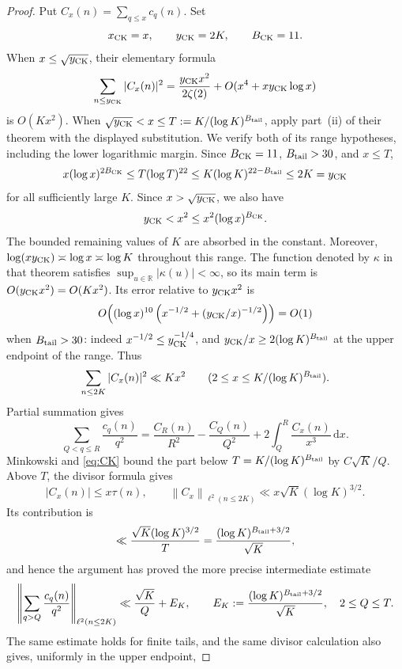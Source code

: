 \documentclass[11pt]{article}
\numberwithin{equation}{section}
\theoremstyle{definition}
\newcommand{\R}{\mathbb R}
\newcommand{\1}{\mathbf 1}
\newcommand{\dd}{\,\mathrm d}
\newcommand{\norm}[1]{\left\lVert#1\right\rVert}
\begin{document}
\begin{proof}
Put \(C_x(n)=\sum_{q\le x}c_q(n)\).
Set
\[
 x_{\rm CK}=x,\qquad y_{\rm CK}=2K,\qquad B_{\rm CK}=11.
\]
When \(x\le\sqrt {y_{\rm CK}}\), their elementary formula
\[
 \sum_{n\le y_{\rm CK}}|C_x(n)|^2
 =\frac{y_{\rm CK}x^2}{2\zeta(2)}
  +O(x^4+xy_{\rm CK}\log x)
\]
is \(O(Kx^2)\).  When
\(\sqrt {y_{\rm CK}}<x\le T:=K/(\log K)^{B_{\rm tail}}\), apply
part~(ii) of their theorem with the displayed substitution.  We verify
both of its range hypotheses, including the lower logarithmic margin.
Since \(B_{\rm CK}=11\), \(B_{\rm tail}>30\), and \(x\le T\),
\[
 x(\log x)^{2B_{\rm CK}}
 \le T(\log T)^{22}
 \le K(\log K)^{22-B_{\rm tail}}
 \le 2K=y_{\rm CK}
\]
for all sufficiently large \(K\).  Since
\(x>\sqrt {y_{\rm CK}}\), we also have
\[
 y_{\rm CK}<x^2\le x^2(\log x)^{B_{\rm CK}}.
\]
The bounded remaining values of \(K\) are absorbed in the constant.
Moreover, \(\log(xy_{\rm CK})\asymp\log x\asymp\log K\) throughout
this range.  The function denoted by \(\kappa\) in that theorem
satisfies \(\sup_{u\in\R}|\kappa(u)|<\infty\), so its main term is
\(O(y_{\rm CK}x^2)=O(Kx^2)\).  Its error relative to
\(y_{\rm CK}x^2\) is
\[
 O\!\left((\log x)^{10}
 \left(x^{-1/2}+(y_{\rm CK}/x)^{-1/2}\right)\right)=O(1)
\]
when \(B_{\rm tail}>30\): indeed
\(x^{-1/2}\le y_{\rm CK}^{-1/4}\), and
\(y_{\rm CK}/x\ge2(\log K)^{B_{\rm tail}}\) at the upper endpoint of the
range.  Thus
\begin{equation}\label{eq:CK}
 \sum_{n\le2K}|C_x(n)|^2\ll Kx^2
 \qquad
 (2\le x\le K/(\log K)^{B_{\rm tail}}).
\end{equation}
Partial summation gives
\[
 \sum_{Q<q\le R}\frac{c_q(n)}{q^2}
 =
 \frac{C_R(n)}{R^2}-\frac{C_Q(n)}{Q^2}
 +2\int_Q^R\frac{C_x(n)}{x^3}\dd x.
\]
Minkowski and \eqref{eq:CK} bound the part below
\(T=K/(\log K)^{B_{\rm tail}}\) by \(C\sqrt K/Q\).
Above \(T\), the divisor formula gives
\[
 |C_x(n)|\le x\tau(n),\qquad
 \norm{C_x}_{\ell^2(n\le2K)}
 \ll x\sqrt K(\log K)^{3/2}.
\]
Its contribution is
\[
 \ll\frac{\sqrt K(\log K)^{3/2}}T
 =\frac{(\log K)^{B_{\rm tail}+3/2}}{\sqrt K},
\]
and hence the argument has proved the more precise intermediate estimate
\begin{equation}\label{eq:ram-tail-two-term}
 \left\|\sum_{q>Q}\frac{c_q(n)}{q^2}\right\|_{\ell^2(n\le2K)}
 \ll \frac{\sqrt K}{Q}
      +E_K,\qquad
 E_K:=\frac{(\log K)^{B_{\rm tail}+3/2}}{\sqrt K},
 \quad 2\le Q\le T.
\end{equation}
The same estimate holds for finite tails, and the same divisor calculation
also gives, uniformly in the upper endpoint,

\end{proof}
\end{document}
